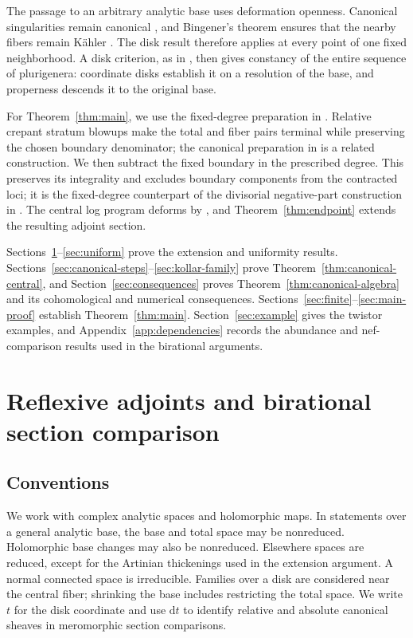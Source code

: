 \documentclass[11pt,a4paper]{article}
\numberwithin{equation}{section}
\theoremstyle{definition}
\theoremstyle{remark}
\begin{document}
The passage to an arbitrary analytic base uses deformation openness.
Canonical singularities remain canonical \cite[VI.5.2]{Nakayama2004},
and Bingener's theorem ensures that the nearby fibers remain Kähler
\cite{Bingener1983,Kirschner2012}. The disk result therefore applies
at every point of one fixed neighborhood. A disk criterion, as in
\cite[paragraph~13]{Kollar2021}, then gives constancy of the entire
sequence of plurigenera: coordinate disks establish it on a resolution
of the base, and properness descends it to the original base.

For Theorem~\ref{thm:main}, we use the fixed-degree preparation in
\cite[proof of Theorem~4.2]{HMX2018}. Relative crepant stratum
blowups make the total and fiber pairs terminal while preserving
the chosen boundary denominator; the canonical preparation in
\cite[Lemma~4.2]{LW2026} is a related construction. We then subtract
the fixed boundary in the prescribed degree. This preserves its
integrality and excludes boundary components from the contracted
loci; it is the fixed-degree counterpart of the divisorial
negative-part construction in \cite[Lemma~4.3]{LW2026}.
The central log program deforms by \cite[Theorem~7.7]{HX2026}, and
Theorem~\ref{thm:endpoint} extends the resulting adjoint section.

Sections~\ref{sec:sheaves}--\ref{sec:uniform} prove the extension
and uniformity results. Sections~\ref{sec:canonical-steps}--\ref{sec:kollar-family}
prove Theorem~\ref{thm:canonical-central}, and
Section~\ref{sec:consequences} proves
Theorem~\ref{thm:canonical-algebra} and its cohomological and numerical
consequences. Sections~\ref{sec:finite}--\ref{sec:main-proof} establish
Theorem~\ref{thm:main}. Section~\ref{sec:example} gives the twistor
examples, and Appendix~\ref{app:dependencies} records the abundance
and nef-comparison results used in the birational arguments.

\section{Reflexive adjoints and birational section comparison}
\label{sec:sheaves}

\subsection{Conventions}

We work with complex analytic spaces and holomorphic maps. In
statements over a general analytic base, the base and total space
may be nonreduced. Holomorphic base changes may also be nonreduced.
Elsewhere spaces are reduced, except for the Artinian thickenings
used in the extension argument.
A normal connected space is irreducible. Families over
a disk are considered near the central fiber; shrinking the base includes
restricting the total space. We write $t$ for the disk coordinate and use
$\mathrm dt$ to identify relative and absolute canonical sheaves in
meromorphic section comparisons.
\end{document}
